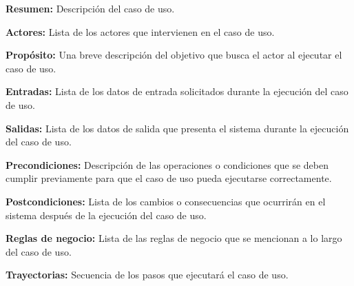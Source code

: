 \begin{objetivos}
	\item {\bf Resumen:} Descripción del caso de uso.
	\item {\bf Actores:} Lista de los actores que intervienen en el caso de uso.
	\item {\bf Propósito:} Una breve descripción del objetivo que busca el actor al ejecutar el caso de uso.
	\item {\bf Entradas:} Lista de los datos de entrada solicitados durante la ejecución del caso de uso.
	\item {\bf Salidas:} Lista de los datos de salida que presenta el sistema durante la ejecución del caso de uso.
	\item {\bf Precondiciones:} Descripción de las operaciones o condiciones que se deben cumplir previamente para que el caso de uso pueda ejecutarse correctamente.
	\item {\bf Postcondiciones:} Lista de los cambios o consecuencias que ocurrirán en el sistema después de la ejecución del caso de uso.
	\item {\bf Reglas de negocio:} Lista de las reglas de negocio que se mencionan a lo largo del caso de uso.
	\item {\bf Trayectorias:} Secuencia de los pasos que ejecutará el caso de uso.
\end{objetivos}
